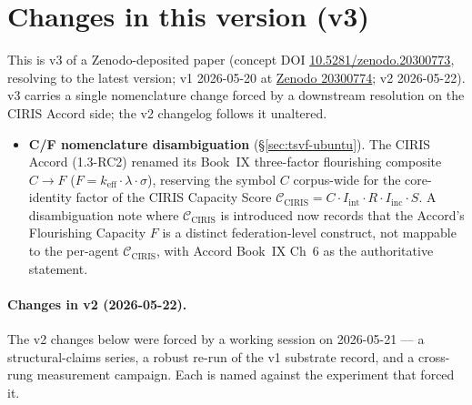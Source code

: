\documentclass[11pt,a4paper]{article}
\newcommand{\keff}{k_{\text{eff}}}
\begin{document}
\section*{Changes in this version (v3)}

This is v3 of a Zenodo-deposited paper (concept DOI \href{https://doi.org/10.5281/zenodo.20300773}{10.5281/zenodo.20300773}, resolving to the latest version; v1 2026-05-20 at \href{https://zenodo.org/records/20300774}{Zenodo 20300774}; v2 2026-05-22). v3 carries a single nomenclature change forced by a downstream resolution on the CIRIS Accord side; the v2 changelog follows it unaltered.

\begin{itemize}[leftmargin=*,itemsep=0.5em]
\item \textbf{C/F nomenclature disambiguation} (\S\ref{sec:tsvf-ubuntu}). The CIRIS Accord (1.3-RC2) renamed its Book~IX three-factor flourishing composite $C \to F$ ($F = \keff \cdot \lambda \cdot \sigma$), reserving the symbol $C$ corpus-wide for the core-identity factor of the CIRIS Capacity Score $\mathcal{C}_{\text{CIRIS}} = C \cdot I_{\text{int}} \cdot R \cdot I_{\text{inc}} \cdot S$. A disambiguation note where $\mathcal{C}_{\text{CIRIS}}$ is introduced now records that the Accord's Flourishing Capacity $F$ is a distinct federation-level construct, not mappable to the per-agent $\mathcal{C}_{\text{CIRIS}}$, with Accord Book~IX Ch~6 as the authoritative statement.
\end{itemize}

\paragraph{Changes in v2 (2026-05-22).} The v2 changes below were forced by a working session on 2026-05-21 --- a structural-claims series, a robust re-run of the v1 substrate record, and a cross-rung measurement campaign. Each is named against the experiment that forced it.
\end{document}
